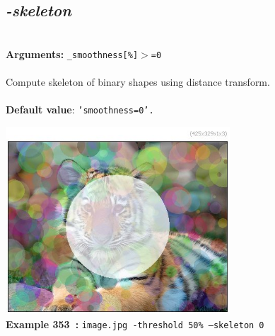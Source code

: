 \documentclass[a4paper,11pt,twoside]{book}
\begin{document}
\subsection{\emph{-skeleton} }\vspace*{-0.5em}
~\\\textbf{Arguments: } 
{\small \texttt{\_smoothness[\%]$>$=0}}\\~\\
Compute skeleton of binary shapes using distance transform.
~\\~\\\textbf{Default value}: {\small \texttt{'smoothness=0'.}}
\begin{center}\includegraphics[keepaspectratio=true,height=7cm,width=\textwidth]{img/gmic_def353.jpg}\\
{\footnotesize \textbf{Example 353~:} \texttt{image.jpg -threshold 50\% --skeleton 0}}
\end{center}
\end{document}
